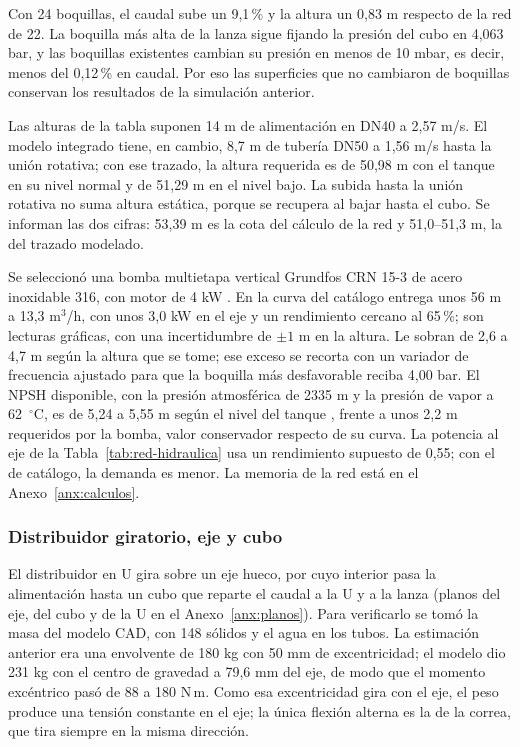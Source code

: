 Con 24 boquillas, el caudal sube un 9,1\,\% y la altura un 0,83 m respecto de la red de 22. La boquilla más alta de la lanza sigue fijando la presión del cubo en 4,063 bar, y las boquillas existentes cambian su presión en menos de 10 mbar, es decir, menos del 0,12\,\% en caudal. Por eso las superficies que no cambiaron de boquillas conservan los resultados de la simulación anterior.

Las alturas de la tabla suponen 14 m de alimentación en DN40 a 2,57 m/s. El modelo integrado tiene, en cambio, 8,7 m de tubería DN50 a 1,56 m/s hasta la unión rotativa; con ese trazado, la altura requerida es de 50,98 m con el tanque en su nivel normal y de 51,29 m en el nivel bajo. La subida hasta la unión rotativa no suma altura estática, porque se recupera al bajar hasta el cubo. Se informan las dos cifras: 53,39 m es la cota del cálculo de la red y 51,0--51,3 m, la del trazado modelado.

Se seleccionó una bomba multietapa vertical Grundfos CRN 15-3 de acero inoxidable 316, con motor de 4 kW \cite[pp.~50--51]{grundfoscr}. En la curva del catálogo entrega unos 56 m a 13,3 m$^3$/h, con unos 3,0 kW en el eje y un rendimiento cercano al 65\,\%; son lecturas gráficas, con una incertidumbre de $\pm1$ m en la altura. Le sobran de 2,6 a 4,7 m según la altura que se tome; ese exceso se recorta con un variador de frecuencia ajustado para que la boquilla más desfavorable reciba 4,00 bar. El NPSH disponible, con la presión atmosférica de 2335 m y la presión de vapor a 62~$^\circ$C, es de 5,24 a 5,55 m según el nivel del tanque \cite{white2016}, frente a unos 2,2 m requeridos por la bomba, valor conservador respecto de su curva. La potencia al eje de la Tabla~\ref{tab:red-hidraulica} usa un rendimiento supuesto de 0,55; con el de catálogo, la demanda es menor. La memoria de la red está en el Anexo~\ref{anx:calculos}.

\subsubsection{Distribuidor giratorio, eje y cubo}
\label{sec:distribuidor}

El distribuidor en U gira sobre un eje hueco, por cuyo interior pasa la alimentación hasta un cubo que reparte el caudal a la U y a la lanza (planos del eje, del cubo y de la U en el Anexo~\ref{anx:planos}). Para verificarlo se tomó la masa del modelo CAD, con 148 sólidos y el agua en los tubos. La estimación anterior era una envolvente de 180 kg con 50 mm de excentricidad; el modelo dio 231 kg con el centro de gravedad a 79,6 mm del eje, de modo que el momento excéntrico pasó de 88 a 180 N\,m. Como esa excentricidad gira con el eje, el peso produce una tensión constante en el eje; la única flexión alterna es la de la correa, que tira siempre en la misma dirección.

